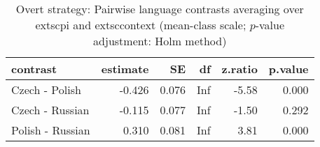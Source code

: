 \begin{table}[!h]
\centering
\caption{Overt strategy: Pairwise language contrasts averaging over 	extsc{pi} and 	extsc{context} (mean-class scale; $p$-value adjustment: Holm method)}
\centering
\begin{tabular}[t]{lrrrrr}
\toprule
contrast & estimate & SE & df & z.ratio & p.value\\
\midrule
Czech - Polish & -0.426 & 0.076 & Inf & -5.58 & 0.000\\
Czech - Russian & -0.115 & 0.077 & Inf & -1.50 & 0.292\\
Polish - Russian & 0.310 & 0.081 & Inf & 3.81 & 0.000\\
\bottomrule
\end{tabular}
\end{table}
